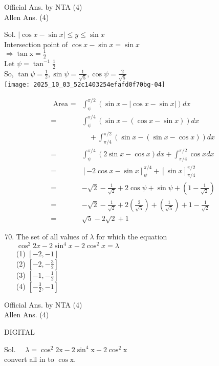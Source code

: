 \documentclass[10pt]{article}
\begin{document}
Official Ans. by NTA (4)\\
Allen Ans. (4)

Sol. \(|\cos x-\sin x| \leq y \leq \sin x\)\\
Intersection point of \(\cos x-\sin x=\sin x\)\\
\(\Rightarrow \tan \mathrm{x}=\frac{1}{2}\)\\
Let \(\psi=\tan ^{-1} \frac{1}{2}\)\\
So, \(\tan \psi=\frac{1}{2}, \sin \psi=\frac{1}{\sqrt{5}}, \cos \psi=\frac{2}{\sqrt{5}}\)\\
\texttt{[image: 2025\_10\_03\_52c1403254efafd0f70bg-04]}

\[
\begin{aligned}
\text { Area }= & \int_{\psi}^{\pi / 2}(\sin x-|\cos x-\sin x|) d x \\
= & \int_{\psi}^{\pi / 4}(\sin x-(\cos x-\sin x)) d x \\
& \quad+\int_{\pi / 4}^{\pi / 2}(\sin x-(\sin x-\cos x)) d x \\
= & \int_{\psi}^{\pi / 4}(2 \sin x-\cos x) d x+\int_{\pi / 4}^{\pi / 2} \cos x d x \\
= & {[-2 \cos x-\sin x]_{\psi}^{\pi / 4}+[\sin x]_{\pi / 4}^{\pi / 2} } \\
= & -\sqrt{2}-\frac{1}{\sqrt{2}}+2 \cos \psi+\sin \psi+\left(1-\frac{1}{\sqrt{2}}\right) \\
= & -\sqrt{2}-\frac{1}{\sqrt{2}}+2\left(\frac{2}{\sqrt{5}}\right)+\left(\frac{1}{\sqrt{5}}\right)+1-\frac{1}{\sqrt{2}} \\
= & \sqrt{5}-2 \sqrt{2}+1
\end{aligned}
\]

\begin{enumerate}
  \setcounter{enumi}{69}
  \item The set of all values of \(\lambda\) for which the equation \(\cos ^{2} 2 x-2 \sin ^{4} x-2 \cos ^{2} x=\lambda\)\\
(1) \([-2,-1]\)\\
(2) \(\left[-2,-\frac{3}{2}\right]\)\\
(3) \(\left[-1,-\frac{1}{2}\right]\)\\
(4) \(\left[-\frac{3}{2},-1\right]\)
\end{enumerate}

Official Ans. by NTA (4)\\
Allen Ans. (4)

DIGITAL

Sol. \(\quad \lambda=\cos ^{2} 2 \mathrm{x}-2 \sin ^{4} \mathrm{x}-2 \cos ^{2} \mathrm{x}\)\\
convert all in to \(\cos \mathrm{x}\).
\end{document}

